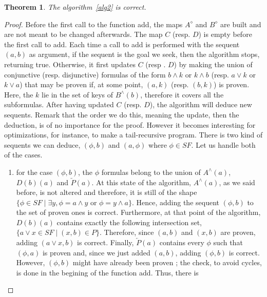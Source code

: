 \documentclass[a4paper, 11pt]{article}
\newtheorem{theorem}{Theorem}
\begin{document}
    \begin{theorem}
	    The algorithm~\ref{alg2} is correct.
    \end{theorem}
    \begin{proof}
	    Before the first call to the function \textsf{add}, the maps $A^\diamond$ and $B^\diamond$
	    are built and are not meant to be changed afterwards. The map $C$ (resp. $D$) is empty 
	    before the
	    first call to \textsf{add}. Each time a call to \textsf{add} is performed with the sequent 
	    $(a,b)$ as argument,
	    if the sequent is the goal we seek, then the algorithm stops, returning true. Otherwise,
	    it first updates $C$ (resp . $D$) by making the union of conjunctive (resp. disjunctive) 
	    formulas of the form $b\wedge k$ or $k\wedge b$ (resp. $a\vee k$ or $k\vee a$) that may be 
	    proven if, at some point, $(a,k)$ (resp. $(b, k)$) is proven. Here, the $k$ lie in
	    the set of keys of $B^\wedge(b)$, therefore it covers all the subformulas. 
	    After having updated $C$ (resp. $D$),
	    the algorithm will deduce new sequents. Remark that the order we do this, meaning the
	    update, then the deduction, is of no importance for the proof. However it becomes 
	    interesting for
	    optimizations, for instance, to make a tail-recursive program. There is two kind of sequents
	    we can deduce, $(\phi,b)$ and $(a,\phi)$ where $\phi\in SF$. Let us handle both of the cases.
	    \begin{enumerate}
		    \item
			    for the case $(\phi,b)$, the $\phi$ formulas belong to the union of 
			    $A^\wedge(a)$, $D(b)(a)$ and $\overleftarrow{P}(a)$. At this state of the 
			    algorithm, $A^\wedge(a)$,
			    as we said before, is not altered and therefore, it is still of the shape
			    $\{\phi\in SF\mid\exists y,\phi=a\wedge y\text{ or }\phi=y\wedge a\}$. Hence,
			    adding the sequent $(\phi,b)$ to the set of proven ones is correct.
			    Furthermore, at that point of the algorithm, $D(b)(a)$ contains exactly the 
			    following intersection set, $\{a\vee x\in SF\mid(x,b)\in P\}$. Therefore,
			    since $(a,b)$ and $(x,b)$ are proven, adding $(a\vee x,b)$ is correct.
			    Finally, $\overleftarrow{P}(a)$ contains every $\phi$ such that $(\phi,a)$
			    is proven and, since we just added $(a,b)$, adding $(\phi,b)$ is correct.
			    However, $(\phi,b)$ might have already been proven ; the check, to avoid
			    cycles, is done in the begining of the function \textsf{add}. Thus, there is

\end{enumerate}
\end{proof}
\end{document}
